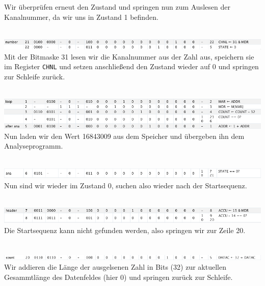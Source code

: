 \documentclass[12pt,titlepage]{article}
\begin{document}
Wir überprüfen erneut den Zustand und springen nun zum Auslesen der Kanalnummer, da wir uns in Zustand 1 befinden.

\leavevmode \\
\includegraphics[width=16cm]{listing/row21-22.png}
\leavevmode \\

Mit der Bitmaske 31 lesen wir die Kanalnummer aus der Zahl aus, speichern sie im Register \texttt{CHNL}
und setzen anschließend den Zustand wieder auf 0 und springen zur Schleife
zurück.

\leavevmode \\
\includegraphics[width=16cm]{listing/row1-5.png}
\leavevmode \\

Nun laden wir den Wert 16843009 aus dem Speicher und übergeben ihn dem Analyseprogramm.

\leavevmode \\
\includegraphics[width=16cm]{listing/row6.png}
\leavevmode \\

Nun sind wir wieder im Zustand 0, suchen also wieder nach der Startsequenz.

\leavevmode \\
\includegraphics[width=16cm]{listing/row7-8.png}
\leavevmode \\

Die Startsequenz kann nicht gefunden werden, also springen wir zur Zeile 20.

\leavevmode \\
\includegraphics[width=16cm]{listing/row20.png}
\leavevmode \\

Wir addieren die Länge der ausgelsenen Zahl in Bits (32) zur aktuellen Gesammtlänge des Datenfeldes (hier 0) und
springen zurück zur Schleife.
\end{document}

